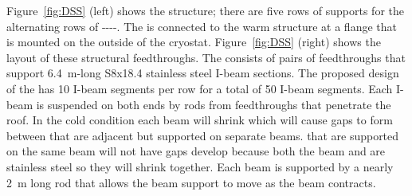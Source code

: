 Figure~\ref{fig:DSS} (left) shows the  structure; there are
five rows of supports for the alternating rows of
----.  The
 is connected to the warm structure at a flange that is
mounted on the outside of the cryostat.  Figure~\ref{fig:DSS} (right)
shows the layout of these structural feedthroughs.  The 
consists of pairs of feedthroughs that support \SI{6.4}{m}-long
S8x18.4 stainless steel I-beam sections. The proposed design of the
 has \num{10} I-beam segments per row for a total of
\num{50} I-beam segments. Each I-beam is suspended on both ends by
rods from feedthroughs that penetrate the roof.  In the cold condition
each beam will shrink which will cause gaps to form between
 that are adjacent but supported on separate beams.
 that are supported on the same beam will not have gaps
develop because both the beam and  are stainless steel so
they will shrink together.  Each beam is supported by a nearly
\SI{2}{m} long rod that allows the beam support to move as the beam
contracts.
